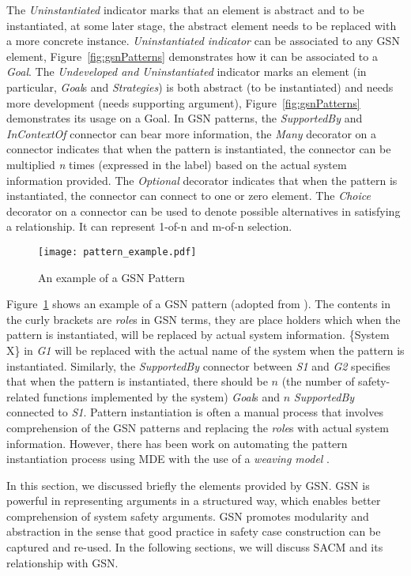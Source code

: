 The \textit{Uninstantiated} indicator marks that an element is abstract and to be instantiated, at some later stage, the abstract element needs to be replaced with a more concrete instance. 
\textit{Uninstantiated indicator} can be associated to any GSN element, Figure~\ref{fig:gsnPatterns} demonstrates how it can be associated to a \textit{Goal}. 
The \textit{Undeveloped and Uninstantiated} indicator marks an element (in particular, \textit{Goal}s and \textit{Strategies}) is both abstract (to be instantiated) and needs more development (needs supporting argument), Figure~\ref{fig:gsnPatterns} demonstrates its usage on a Goal. 
In GSN patterns, the \textit{SupportedBy} and \textit{InContextOf} connector can bear more information, the \textit{Many} decorator on a connector indicates that when the pattern is instantiated, the connector can be multiplied \textit{n} times (expressed in the label) based on the actual system information provided. 
The \textit{Optional} decorator indicates that when the pattern is instantiated, the connector can connect to one or zero element. 
The \textit{Choice} decorator on a connector can be used to denote possible alternatives in satisfying a relationship. 
It can represent 1-of-n and m-of-n selection. 

\begin{figure}[ht!]
	\centering
	\texttt{[image: pattern\_example.pdf]}
	\caption{An example of a GSN Pattern \cite{kelly1997safety}}
	\label{fig:dmilsPattern}
\end{figure}

Figure~\ref{fig:dmilsPattern} shows an example of a GSN pattern (adopted from \cite{kelly1997safety}). 
The contents in the curly brackets are \textit{role}s in GSN terms, they are place holders which when the pattern is instantiated, will be replaced by actual system information.  
\{System X\} in \textit{G1} will be replaced with the actual name of the system when the pattern is instantiated.
Similarly, the \textit{SupportedBy} connector between \textit{S1} and \textit{G2} specifies that when the pattern is instantiated, there should be $n$ (the number of safety-related functions implemented by the system) \textit{Goal}s and $n$ \textit{SupportedBy} connected to \textit{S1}. 
Pattern instantiation is often a manual process that involves comprehension of the GSN patterns and replacing the \textit{role}s with actual system information. 
However, there has been work on automating the pattern instantiation process using MDE with the use of a \textit{weaving model} \cite{hawkins2015weaving}. 

In this section, we discussed briefly the elements provided by GSN. 
GSN is powerful in representing arguments in a structured way, which enables better comprehension of system safety arguments. 
GSN promotes modularity and abstraction in the sense that good practice in safety case construction can be captured and re-used. 
In the following sections, we will discuss SACM and its relationship with GSN. 